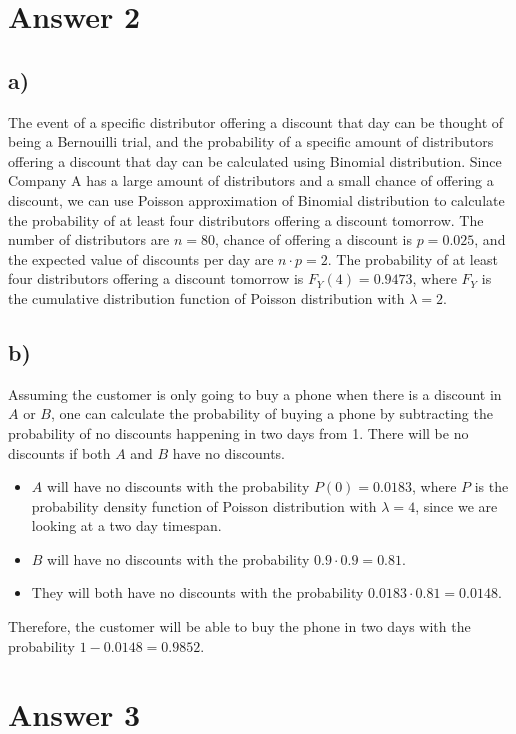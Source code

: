 \documentclass[12pt]{article}
\begin{document}
\section*{Answer 2}

\subsection*{a)} 

The event of a specific distributor offering a discount that day can be thought
of being a Bernouilli trial, and the probability of a specific amount of
distributors offering a discount that day can be calculated using Binomial
distribution.
Since Company A has a large amount of distributors and a small chance of
offering a discount, we can use Poisson approximation of Binomial distribution
to calculate the probability of at least four distributors offering a discount
tomorrow.
\newline
The number of distributors are $n = 80$, chance of offering a discount is
$p = 0.025$, and the expected value of discounts per day are $n \cdot p = 2$.
The probability of at least four distributors offering a discount tomorrow is
$F_Y(4) = 0.9473$, where $F_Y$ is the cumulative distribution function of
Poisson distribution with $\lambda = 2$.

\subsection*{b)} 

Assuming the customer is only going to buy a phone when there is a discount
in $A$ or $B$, one can calculate the probability of buying a phone by subtracting the probability of no discounts happening in two days from 1.
\newline
There will be no discounts if both $A$ and $B$ have no discounts.
\begin{itemize}
    \item $A$ will have no discounts with the probability $P(0) = 0.0183$, where $P$ is the probability density function of Poisson distribution with $\lambda = 4$, since we are looking at a two day timespan.
    \item $B$ will have no discounts with the probability $0.9 \cdot 0.9 = 0.81$.
    \item They will both have no discounts with the probability $0.0183 \cdot 0.81 = 0.0148$.
\end{itemize}
Therefore, the customer will be able to buy the phone in two days with the probability $1 - 0.0148 = 0.9852$.


\section*{Answer 3}
\end{document}

